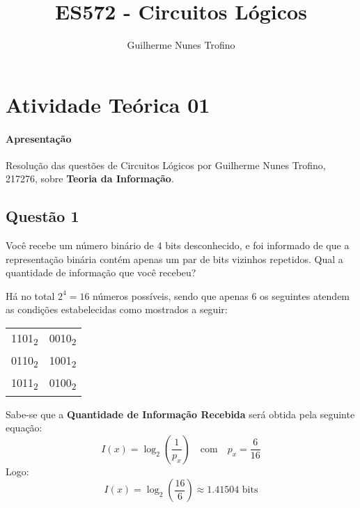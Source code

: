 \documentclass{article}
\title{ES572 - Circuitos Lógicos}
\author{Guilherme Nunes Trofino}
\begin{document}
    \maketitle
\newpage

    \section{Atividade Teórica 01}
        \paragraph{Apresentação}Resolução das questões de Circuitos Lógicos por Guilherme Nunes Trofino, 217276, sobre \textbf{Teoria da Informação}.

        \subsection{Questão 1}
            \begin{exercise}
                Você recebe um número binário de 4 bits desconhecido, e foi informado de que a representação binária contém apenas um par de bits vizinhos repetidos. Qual a quantidade de informação que você recebeu?
            \end{exercise}
            \begin{resolution}
                Há no total $2^{4} = 16$ números possíveis, sendo que apenas $6$ os seguintes atendem as condições estabelecidas como mostrados a seguir:
                    \begin{table}[H]
                        \centering
                        \begin{tabular}[]{cc}\hline
                            1101\textsubscript{2} & 0010\textsubscript{2}\\
                            0110\textsubscript{2} & 1001\textsubscript{2}\\
                            1011\textsubscript{2} & 0100\textsubscript{2}\\\hline
                        \end{tabular}
                    \end{table}\noindent
                Sabe-se que a \textbf{Quantidade de Informação Recebida} será obtida pela seguinte equação:
                    \begin{equation*}
                        I(x) = \log_{2}\left(\frac{1}{p_{x}}\right)
                        \quad\text{com}\quad
                        p_{x} = \frac{6}{16}
                    \end{equation*}
                Logo:
                    \begin{equation*}
                        I(x) = \log_{2}\left(\frac{16}{6}\right) \approx \boxed{1.41504 \text{ bits}}
                    \end{equation*}
            \end{resolution}
\end{document}
